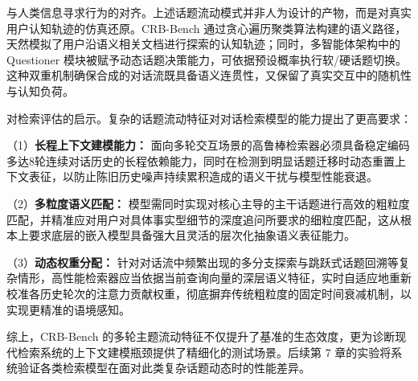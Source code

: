 与人类信息寻求行为的对齐。上述话题流动模式并非人为设计的产物，而是对真实用户认知轨迹的仿真还原。CRB-Bench 通过贪心遍历聚类算法构建的语义路径，天然模拟了用户沿语义相关文档进行探索的认知轨迹；同时，多智能体架构中的 Questioner 模块被赋予动态话题决策能力，可依据预设概率执行软/硬话题切换。这种双重机制确保合成的对话流既具备语义连贯性，又保留了真实交互中的随机性与认知负荷。

对检索评估的启示。复杂的话题流动特征对对话检索模型的能力提出了更高要求：

（1）\textbf{长程上下文建模能力：} 面向多轮交互场景的高鲁棒检索器必须具备稳定编码多达8轮连续对话历史的长程依赖能力，同时在检测到明显话题迁移时动态重置上下文表征，以防止陈旧历史噪声持续累积造成的语义干扰与模型性能衰退。

（2）\textbf{多粒度语义匹配：} 模型需同时实现对核心主导的主干话题进行高效的粗粒度匹配，并精准应对用户对具体事实型细节的深度追问所要求的细粒度匹配，这从根本上要求底层的嵌入模型具备强大且灵活的层次化抽象语义表征能力。

（3）\textbf{动态权重分配：} 针对对话流中频繁出现的多分支探索与跳跃式话题回溯等复杂情形，高性能检索器应当依据当前查询向量的深层语义特征，实时自适应地重新校准各历史轮次的注意力贡献权重，彻底摒弃传统粗粒度的固定时间衰减机制，以实现更精准的语境感知。


综上，CRB-Bench 的多轮主题流动特征不仅提升了基准的生态效度，更为诊断现代检索系统的上下文建模瓶颈提供了精细化的测试场景。后续第 7 章的实验将系统验证各类检索模型在面对此类复杂话题动态时的性能差异。







